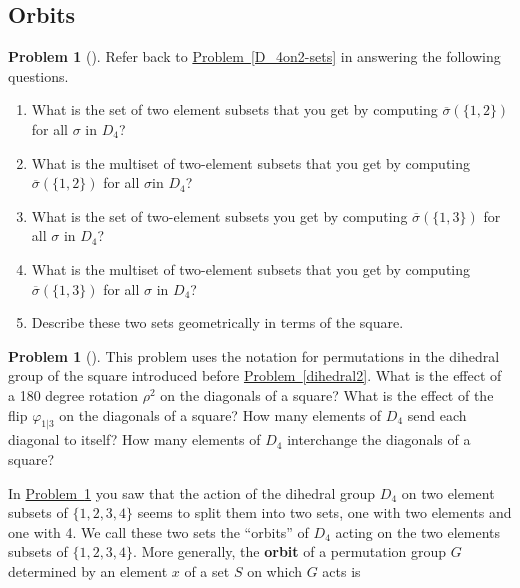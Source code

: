 \documentclass[10pt,]{book}
\newcommand{\terminology}[1]{\textbf{#1}}
\theoremstyle{plain}
\theoremstyle{definition}
\newtheorem{activity}[project]{Problem}
\theoremstyle{definition}
\numberwithin{equation}{chapter}
\begin{document}
\subsection[{Orbits}]{Orbits}\label{subsection-66}
\begin{activity}[] \label{orbits1}
Refer back to \hyperref[D_4on2-sets]{Problem~\ref{D_4on2-sets}} in answering the following questions.%
\begin{enumerate}[font=\bfseries,label=(\alph*),ref=\alph*]
\item\label{task-214} \marginsymbol[-2.5em]{} What is the set of two element subsets that you get by computing \(\overline{\sigma}(\{1,2\})\) for all \(\sigma\) in \(D_4\)?%
\item\label{task-215} \marginsymbol[-2.5em]{} What is the multiset of two-element subsets that you get by computing \(\overline{\sigma}(\{1,2\})\) for all \(\sigma\)in \(D_4\)?%
\item\label{task-216} \marginsymbol[-2.5em]{} What is the set of two-element subsets you get by computing \(\overline{\sigma}(\{1,3\})\) for all \(\sigma\) in \(D_4\)?%
\item\label{task-217} \marginsymbol[-2.5em]{} What is the multiset of two-element subsets that you get by computing \(\overline{\sigma}(\{1,3\})\) for all \(\sigma\) in \(D_4\)?%
\item\label{task-218} \marginsymbol[-2.5em]{} Describe these two sets geometrically in terms of the square.%
\end{enumerate}
\end{activity}
\begin{activity}[] \label{activity-288}
This problem uses the notation for permutations in the dihedral group of the square introduced before \hyperref[dihedral2]{Problem~\ref{dihedral2}}. What is the effect of a 180 degree rotation \(\rho^2\) on the diagonals of a square? What is the effect of the flip \(\varphi_{1|3}\) on the diagonals of a square? How many elements of \(D_4\) send each diagonal to itself? How many elements of \(D_4\) interchange the diagonals of a square?%
\end{activity}
In \hyperref[orbits1]{Problem~\ref{orbits1}} you saw that the action of the dihedral group \(D_4\) on two element subsets of \(\{1,2,3,4\}\) seems to split them into two sets, one with two elements and one with 4. We call these two sets the ``orbits'' of \(D_4\) acting on the two elements subsets of \(\{1,2,3,4\}\). More generally, the \terminology{orbit} of a permutation group \(G\) determined by an element \(x\) of a set \(S\) on which \(G\) acts is%
\end{document}

